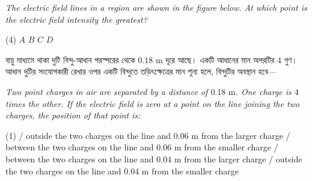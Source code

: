 \documentclass[13pt,a4paper]{extarticle}
\newcommand{\questionheader}[1]{%
  \vspace{0.4cm}\noindent{\Large\textbf{#1}}\vspace{0.12cm}%
}
\begin{document}
\vspace{0.08cm}
\textit{The electric field lines in a region are shown in the figure below. At which point is the electric field intensity the greatest?}

\begin{center}
\end{center}

\begin{tasks}(4)
  \task $A$
  \task $B$
  \task $C$
  \task $D$
\end{tasks}

\questionheader{Question 17}

{\bengalifont বায়ু মাধ্যমে থাকা দুটি বিন্দু-আধান পরস্পরের থেকে $0.18\text{ m}$ দূরে আছে। একটি আধানের মান অপরটির $4$ গুণ। আধান দুটির সংযোগকারী রেখার ওপর একটি বিন্দুতে তড়িৎক্ষেত্রের মান শূন্য হলে, বিন্দুটির অবস্থান হবে—}

\vspace{0.08cm}
\textit{Two point charges in air are separated by a distance of $0.18\text{ m}$. One charge is $4$ times the other. If the electric field is zero at a point on the line joining the two charges, the position of that point is:}

\begin{tasks}(1)
   / outside the two charges on the line and $0.06\text{ m}$ from the larger charge
   / between the two charges on the line and $0.06\text{ m}$ from the smaller charge
   / between the two charges on the line and $0.04\text{ m}$ from the larger charge
   / outside the two charges on the line and $0.04\text{ m}$ from the smaller charge
\end{tasks}
\end{document}
